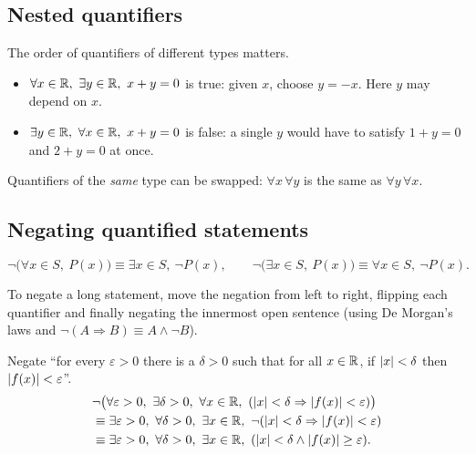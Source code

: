 \subsection{Nested quantifiers}

The order of quantifiers of different types matters.

\begin{example}
\begin{itemize}
  \item $\forall x \in \R,\ \exists y \in \R,\ x + y = 0$ is true: given $x$, choose
        $y = -x$. Here $y$ may depend on $x$.
  \item $\exists y \in \R,\ \forall x \in \R,\ x + y = 0$ is false: a single $y$ would have
        to satisfy $1 + y = 0$ and $2 + y = 0$ at once.
\end{itemize}
Quantifiers of the \emph{same} type can be swapped: $\forall x\, \forall y$ is the same as
$\forall y\, \forall x$.
\end{example}

\subsection{Negating quantified statements}

\begin{theorem}
\[
\neg\bigl(\forall x \in S,\ P(x)\bigr) \equiv \exists x \in S,\ \neg P(x),
\qquad
\neg\bigl(\exists x \in S,\ P(x)\bigr) \equiv \forall x \in S,\ \neg P(x).
\]
\end{theorem}

To negate a long statement, move the negation from left to right, flipping each quantifier
and finally negating the innermost open sentence (using De Morgan's laws and
$\neg(A\Rightarrow B)\equiv A \wedge \neg B$).

\begin{example}
Negate ``for every $\varepsilon > 0$ there is a $\delta > 0$ such that for all $x\in\mathbb{R}$, if
$\left\lvert x \right\rvert < \delta$ then $\left\lvert f(x) \right\rvert < \varepsilon$''.
\begin{align*}
&\neg\bigl(\forall \varepsilon > 0,\ \exists \delta > 0,\ \forall x \in \R,\
  (\abs{x} < \delta \Rightarrow \abs{f(x)} < \varepsilon)\bigr)\\
&\equiv \exists \varepsilon > 0,\ \forall \delta > 0,\ \exists x \in \R,\
  \neg(\abs{x} < \delta \Rightarrow \abs{f(x)} < \varepsilon)\\
&\equiv \exists \varepsilon > 0,\ \forall \delta > 0,\ \exists x \in \R,\
  (\abs{x} < \delta \wedge \abs{f(x)} \geq \varepsilon).
\end{align*}
\end{example}

